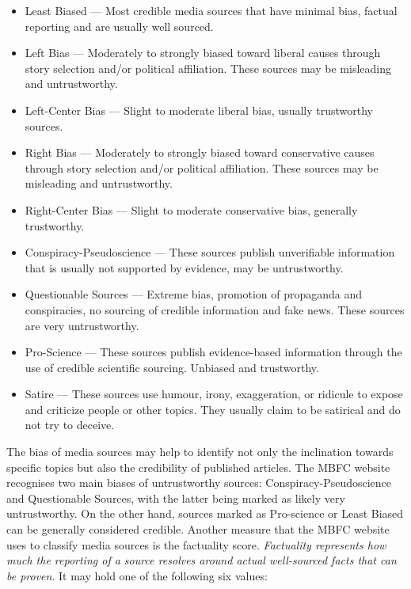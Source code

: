 \begin{itemize}
    \item Least Biased --- Most credible media sources that have minimal bias, factual reporting and are usually well sourced.
    
    \item Left Bias ---  Moderately to strongly biased toward liberal causes through story selection and/or political affiliation. These sources may be misleading and untrustworthy.
    
    \item Left-Center Bias --- Slight to moderate liberal bias, usually trustworthy sources.

    \item Right Bias --- Moderately to strongly biased toward conservative causes through story selection and/or political affiliation. These sources may be misleading and untrustworthy.

    \item Right-Center Bias --- Slight to moderate conservative bias, generally trustworthy.

    \item Conspiracy-Pseudoscience --- These sources publish unverifiable information that is usually not supported by evidence, may be untrustworthy.

    \item Questionable Sources --- Extreme bias, promotion of propaganda and conspiracies, no sourcing of credible information and fake news. These sources are very untrustworthy.

    \item Pro-Science --- These sources publish evidence-based information through the use of credible scientific sourcing. Unbiased and trustworthy.

    \item Satire --- These sources use humour, irony, exaggeration, or ridicule to expose and criticize people or other topics. They usually claim to be satirical and do not try to deceive.
\end{itemize}

The bias of media sources may help to identify not only the inclination towards specific topics but also the credibility of published articles. The MBFC website recognises two main biases of untrustworthy sources: Conspiracy-Pseudoscience and Questionable Sources, with the latter being marked as likely very untrustworthy. On the other hand, sources marked as Pro-science or Least Biased can be generally considered credible. 
Another measure that the MBFC website uses to classify media sources is the factuality score. \emph{Factuality represents how much the reporting of a source resolves around actual well-sourced facts that can be proven}. It may hold one of the following six values:

